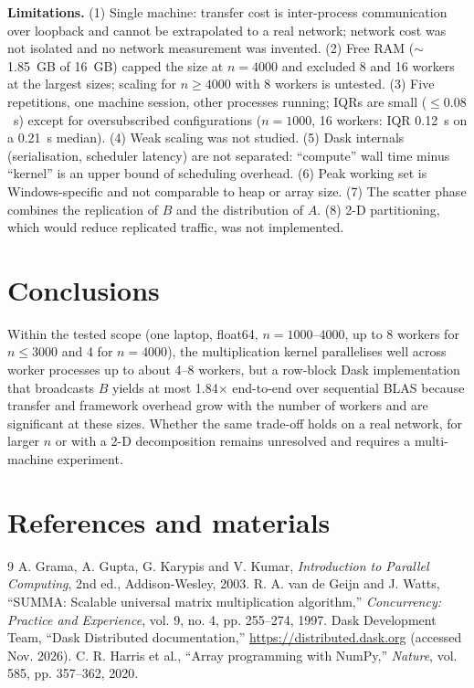 \documentclass[10pt,a4paper]{article}
\begin{document}
\textbf{Limitations.}
(1) Single machine: transfer cost is inter-process communication over loopback and cannot be extrapolated to a real network; network cost was not isolated and no network measurement was invented.
(2) Free RAM ($\sim$1.85~GB of 16~GB) capped the size at $n=4000$ and excluded 8 and 16 workers at the largest sizes; scaling for $n\ge4000$ with 8 workers is untested.
(3) Five repetitions, one machine session, other processes running; IQRs are small ($\le0.08$~s) except for oversubscribed configurations ($n=1000$, 16 workers: IQR 0.12~s on a 0.21~s median).
(4) Weak scaling was not studied.
(5) Dask internals (serialisation, scheduler latency) are not separated: ``compute'' wall time minus ``kernel'' is an upper bound of scheduling overhead.
(6) Peak working set is Windows-specific and not comparable to heap or array size.
(7) The scatter phase combines the replication of $B$ and the distribution of $A$.
(8) 2-D partitioning, which would reduce replicated traffic, was not implemented.

\section{Conclusions}
Within the tested scope (one laptop, float64, $n=1000$--$4000$, up to 8 workers for $n\le3000$ and 4 for $n=4000$), the multiplication kernel parallelises well across worker processes up to about 4--8 workers, but a row-block Dask implementation that broadcasts $B$ yields at most 1.84$\times$ end-to-end over sequential BLAS because transfer and framework overhead grow with the number of workers and are significant at these sizes. Whether the same trade-off holds on a real network, for larger $n$ or with a 2-D decomposition remains unresolved and requires a multi-machine experiment.

\section{References and materials}
\begin{thebibliography}{9}\small
{} A. Grama, A. Gupta, G. Karypis and V. Kumar, \emph{Introduction to Parallel Computing}, 2nd ed., Addison-Wesley, 2003.
 R. A. van de Geijn and J. Watts, ``SUMMA: Scalable universal matrix multiplication algorithm,'' \emph{Concurrency: Practice and Experience}, vol. 9, no. 4, pp. 255--274, 1997.
 Dask Development Team, ``Dask Distributed documentation,'' \url{https://distributed.dask.org} (accessed Nov. 2026).
 C. R. Harris et al., ``Array programming with NumPy,'' \emph{Nature}, vol. 585, pp. 357--362, 2020.
\end{thebibliography}
\end{document}
